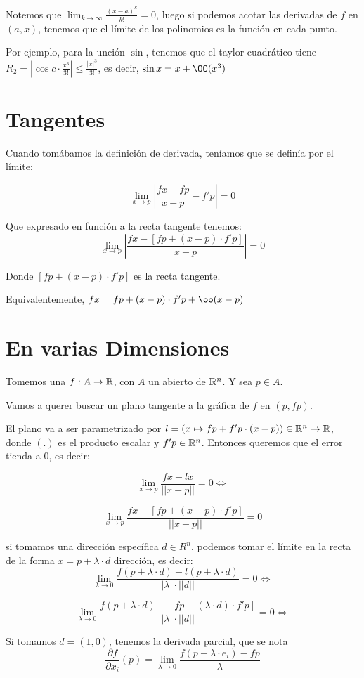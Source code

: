\documentclass{article}
\begin{document}
Notemos que $\lim_{k \to \infty} \frac{(x-a)^k}{k!} = 0$, luego si podemos
acotar las derivadas de $f$ en $(a, x)$, tenemos que el límite de los
polinomios es la función en cada punto.

Por ejemplo, para la unción $\sin$, tenemos que el taylor cuadrático tiene $R_2
= \left|\cos c \cdot \frac{x^3}{3!}\right| \leq \frac{|x|^3}{3!}$, es decir,
$\sin x = x + \OO(x^3)$

\section*{Tangentes}
Cuando tomábamos la definición de derivada, teníamos que se definía por el
límite:

\[
	\lim_{x \to p} \left|\frac{fx-fp}{x-p} -f'p\right| = 0
\]

Que expresado en función a la recta tangente tenemos:
\[
	\lim_{x \to p} \left|\frac{fx-[fp + (x-p) \cdot f'p]}{x-p}\right| = 0
\]

Donde $[fp + (x-p) \cdot f'p]$ es la recta tangente.

Equivalentemente, $fx = fp + (x-p) \cdot f'p + \oo (x-p)$

\section*{En varias Dimensiones}
Tomemos una $f : A \to \mathbb{R}$, con $A$ un abierto de $\mathbb{R}^n$. Y sea $p \in A$.

Vamos a querer buscar un plano tangente a la gráfica de $f$ en $(p, fp)$.

El plano va a ser parametrizado por $l = (x \mapsto fp
+ f'p \cdot (x-p)) \in \mathbb{R}^n \to \mathbb{R}$, donde $(.)$ es el
producto escalar y $f'p \in \mathbb{R}^n$.
Entonces queremos que el error tienda a $0$, es decir:

\[
	\lim_{x \to p} \frac{fx-lx}{||x-p||} = 0 \iff
\]

\[
	\lim_{x \to p} \frac{fx-[fp + (x-p) \cdot f'p]}{||x-p||} = 0
\]

si tomamos una dirección específica $d \in R^n$, podemos tomar el límite en la
recta de la forma $x = p + \lambda \cdot d$
dirección, es decir:
\[
	\lim_{\lambda \to 0} \frac{f(p + \lambda \cdot d)-
	l(p + \lambda \cdot d)}{|\lambda| \cdot ||d||} = 0 \iff
\]

\[
	\lim_{\lambda \to 0} \frac{f(p + \lambda \cdot d)-
	[fp + (\lambda \cdot d) \cdot f'p]}{|\lambda| \cdot ||d||} = 0 \iff
\]

Si tomamos $d = (1, 0)$, tenemos la derivada parcial, que se nota
\[\frac{\partial f}{\partial x_i} (p) =
	\lim_{\lambda \to 0} \frac{f(p + \lambda \cdot e_i)-
	fp}{\lambda}
\]
\end{document}
